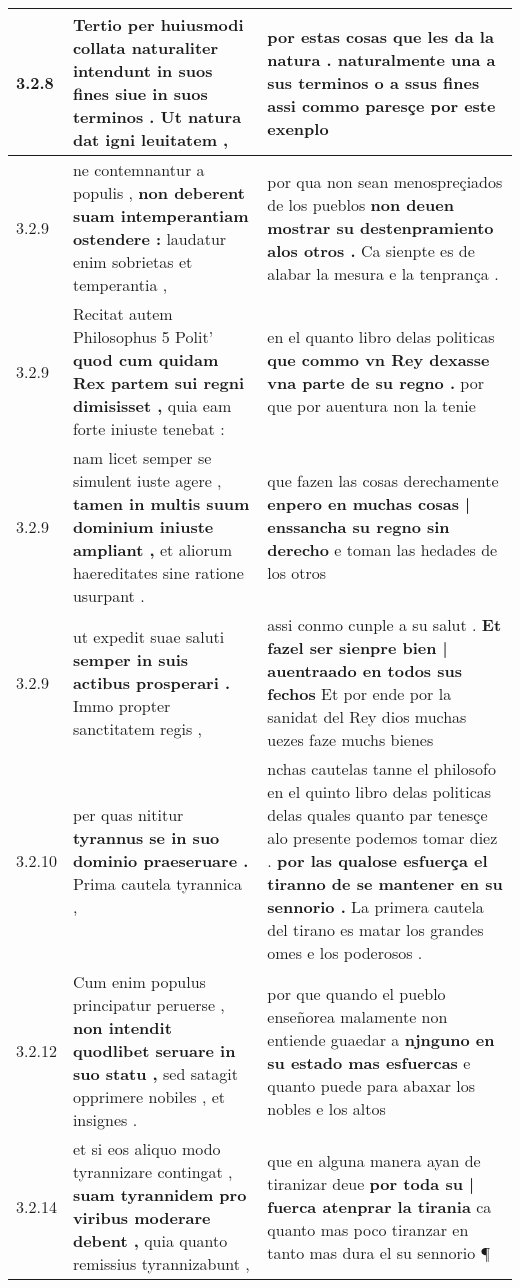 \begin{tabular}{|p{1cm}|p{6.5cm}|p{6.5cm}|}
3.2.8 & Tertio per huiusmodi collata naturaliter intendunt \textbf{ in suos fines siue in suos terminos . } Ut natura dat igni leuitatem , & por estas cosas que les da la natura . \textbf{ naturalmente una a sus terminos o a ssus fines } assi commo paresçe por este exenplo \\\hline
3.2.9 & ne contemnantur a populis , \textbf{ non deberent suam intemperantiam ostendere : } laudatur enim sobrietas et temperantia , & por qua non sean menospreçiados de los pueblos \textbf{ non deuen mostrar su destenpramiento alos otros . } Ca sienpte es de alabar la mesura e la tenprança . \\\hline
3.2.9 & Recitat autem Philosophus 5 Polit’ \textbf{ quod cum quidam Rex partem sui regni dimisisset , } quia eam forte iniuste tenebat : & en el quanto libro delas politicas \textbf{ que commo vn Rey dexasse vna parte de su regno . } por que por auentura non la tenie \\\hline
3.2.9 & nam licet semper se simulent iuste agere , \textbf{ tamen in multis suum dominium iniuste ampliant , } et aliorum haereditates sine ratione usurpant . & que fazen las cosas derechamente \textbf{ enpero en muchas cosas | enssancha su regno sin derecho } e toman las hedades de los otros \\\hline
3.2.9 & ut expedit suae saluti \textbf{ semper in suis actibus prosperari . } Immo propter sanctitatem regis , & assi conmo cunple a su salut . \textbf{ Et fazel ser sienpre bien | auentraado en todos sus fechos } Et por ende por la sanidat del Rey dios muchas uezes faze muchs bienes \\\hline
3.2.10 & per quas nititur \textbf{ tyrannus se in suo dominio praeseruare . } Prima cautela tyrannica , & nchas cautelas tanne el philosofo en el quinto libro delas politicas delas quales quanto par tenesçe alo presente podemos tomar diez . \textbf{ por las qualose esfuerça el tiranno de se mantener en su sennorio . } La primera cautela del tirano es matar los grandes omes e los poderosos . \\\hline
3.2.12 & Cum enim populus principatur peruerse , \textbf{ non intendit quodlibet seruare in suo statu , } sed satagit opprimere nobiles , et insignes . & por que quando el pueblo enseñorea malamente non entiende guaedar a \textbf{ njnguno en su estado mas esfuercas } e quanto puede para abaxar los nobles e los altos \\\hline
3.2.14 & et si eos aliquo modo tyrannizare contingat , \textbf{ suam tyrannidem pro viribus moderare debent , } quia quanto remissius tyrannizabunt , & que en alguna manera ayan de tiranizar deue \textbf{ por toda su | fuerca atenprar la tirania } ca quanto mas poco tiranzar en tanto mas dura el su sennorio ¶ \\\hline

\end{tabular}

